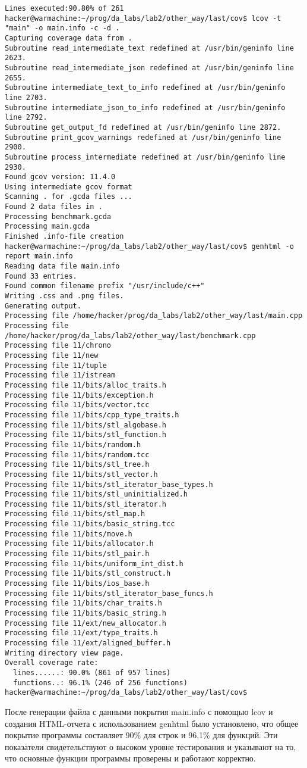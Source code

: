 \documentclass[12pt]{article}
\begin{document}
\begin{lstlisting}
Lines executed:90.80% of 261
hacker@warmachine:~/prog/da_labs/lab2/other_way/last/cov$ lcov -t "main" -o main.info -c -d .
Capturing coverage data from .
Subroutine read_intermediate_text redefined at /usr/bin/geninfo line 2623.
Subroutine read_intermediate_json redefined at /usr/bin/geninfo line 2655.
Subroutine intermediate_text_to_info redefined at /usr/bin/geninfo line 2703.
Subroutine intermediate_json_to_info redefined at /usr/bin/geninfo line 2792.
Subroutine get_output_fd redefined at /usr/bin/geninfo line 2872.
Subroutine print_gcov_warnings redefined at /usr/bin/geninfo line 2900.
Subroutine process_intermediate redefined at /usr/bin/geninfo line 2930.
Found gcov version: 11.4.0
Using intermediate gcov format
Scanning . for .gcda files ...
Found 2 data files in .
Processing benchmark.gcda
Processing main.gcda
Finished .info-file creation
hacker@warmachine:~/prog/da_labs/lab2/other_way/last/cov$ genhtml -o report main.info
Reading data file main.info
Found 33 entries.
Found common filename prefix "/usr/include/c++"
Writing .css and .png files.
Generating output.
Processing file /home/hacker/prog/da_labs/lab2/other_way/last/main.cpp
Processing file /home/hacker/prog/da_labs/lab2/other_way/last/benchmark.cpp
Processing file 11/chrono
Processing file 11/new
Processing file 11/tuple
Processing file 11/istream
Processing file 11/bits/alloc_traits.h
Processing file 11/bits/exception.h
Processing file 11/bits/vector.tcc
Processing file 11/bits/cpp_type_traits.h
Processing file 11/bits/stl_algobase.h
Processing file 11/bits/stl_function.h
Processing file 11/bits/random.h
Processing file 11/bits/random.tcc
Processing file 11/bits/stl_tree.h
Processing file 11/bits/stl_vector.h
Processing file 11/bits/stl_iterator_base_types.h
Processing file 11/bits/stl_uninitialized.h
Processing file 11/bits/stl_iterator.h
Processing file 11/bits/stl_map.h
Processing file 11/bits/basic_string.tcc
Processing file 11/bits/move.h
Processing file 11/bits/allocator.h
Processing file 11/bits/stl_pair.h
Processing file 11/bits/uniform_int_dist.h
Processing file 11/bits/stl_construct.h
Processing file 11/bits/ios_base.h
Processing file 11/bits/stl_iterator_base_funcs.h
Processing file 11/bits/char_traits.h
Processing file 11/bits/basic_string.h
Processing file 11/ext/new_allocator.h
Processing file 11/ext/type_traits.h
Processing file 11/ext/aligned_buffer.h
Writing directory view page.
Overall coverage rate:
  lines......: 90.0% (861 of 957 lines)
  functions..: 96.1% (246 of 256 functions)
hacker@warmachine:~/prog/da_labs/lab2/other_way/last/cov$
\end{lstlisting}
После генерации файла с данными покрытия main.info с помощью lcov и создания HTML-отчета с использованием genhtml было установлено, что общее покрытие программы составляет 90\% для строк и 96,1\% для функций. Эти показатели свидетельствуют о высоком уровне тестирования и указывают на то, что основные функции программы проверены и работают корректно.
\end{document}
